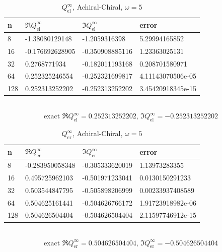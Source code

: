 \begin{table}
  \centering
  \renewcommand{\arraystretch}{1.1}
  \caption{$Q_\text{el}^\infty$, Achiral-Chiral, $\omega=5$}
  \begin{tabular}{@{}llll@{}}
    \toprule
    n & $\Re{Q_\text{el}^\infty}$ & $\Im{Q_\text{el}^\infty}$ & error \\
    \midrule
8 & -1.38080129148 & -1.2059316398 & 5.29994165852\\ 
16 & -0.176692628905 & -0.350908885116 & 1.23363025131\\ 
32 & 0.2768771934 & -0.182011193168 & 0.208701580971\\ 
64 & 0.252325246554 & -0.252321699817 & 4.11143070506e-05\\ 
128 & 0.252313252202 & -0.252313252202 & 3.45420918345e-15\\ 
    \bottomrule
  \end{tabular}
  \\ 
  $$\text{exact }\Re{Q_\text{el}^\infty}=0.252313252202,\,\Im{Q_\text{el}^\infty}=-0.252313252202$$  
\end{table}

\begin{table}
  \centering
  \renewcommand{\arraystretch}{1.1}
  \caption{$Q_\text{er}^\infty$, Achiral-Chiral, $\omega=5$}
  \begin{tabular}{@{}llll@{}}
    \toprule
    n & $\Re{Q_\text{er}^\infty}$ & $\Im{Q_\text{er}^\infty}$ & error \\
    \midrule
8 & -0.283950058348 & -0.305333620019 & 1.13973283355\\ 
16 & 0.495725962103 & -0.501971233041 & 0.0130150291233\\ 
32 & 0.503544847795 & -0.505898206999 & 0.00233937408589\\ 
64 & 0.504625161441 & -0.504626766172 & 1.91723918982e-06\\ 
128 & 0.504626504404 & -0.504626504404 & 2.11597746912e-15\\ 
    \bottomrule
  \end{tabular}
  \\ 
  $$\text{exact }\Re{Q_\text{er}^\infty}=0.504626504404,\,\Im{Q_\text{er}^\infty}=-0.504626504404$$  
\end{table}

